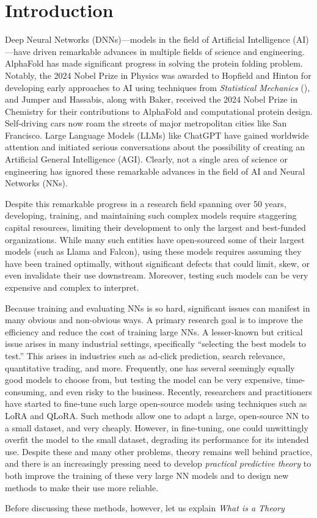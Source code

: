 
\section{Introduction}
\label{sxn:intro}
Deep Neural Networks (DNNs)—models in the field of Artificial Intelligence (AI)—have driven remarkable advances in multiple fields of science and engineering. AlphaFold has made significant progress in solving the protein folding problem.\cite{AlphaFold} Notably, the 2024 Nobel Prize in Physics was awarded to Hopfield and Hinton for developing early approaches to AI using techniques from \emph{Statistical Mechanics} (\STATMECH), and Jumper and Hassabis, along with Baker, received the 2024 Nobel Prize in Chemistry for their contributions to AlphaFold and computational protein design.\cite{Nobel2024Physics, Nobel2024Chemistry} Self-driving cars now roam the streets of major metropolitan cities like San Francisco. Large Language Models (LLMs) like ChatGPT have gained worldwide attention and initiated serious conversations about the possibility of creating an Artificial General Intelligence (AGI). Clearly, not a single area of science or engineering has ignored these remarkable advances in the field of AI and Neural Networks (NNs).

Despite this remarkable progress in a research field spanning over 50 years, developing, training, and maintaining such complex models require staggering capital resources, limiting their development to only the largest and best-funded organizations. While many such entities have open-sourced some of their largest models (such as Llama and Falcon), using these models requires assuming they have been trained optimally, without significant defects that could limit, skew, or even invalidate their use downstream. Moreover, testing such models can be very expensive and complex to interpret.

Because training and evaluating NNs is so hard, significant issues can manifest in many obvious and non-obvious ways. A primary research goal is to improve the efficiency and reduce the cost of training large NNs. A lesser-known but critical issue arises in many industrial settings, specifically “selecting the best models to test.” This arises in industries such as ad-click prediction, search relevance, quantitative trading, and more. Frequently, one has several seemingly equally good models to choose from, but testing the model can be very expensive, time-consuming, and even risky to the business. Recently, researchers and practitioners have started to fine-tune such large open-source models using techniques such as LoRA and QLoRA. Such methods allow one to adapt a large, open-source NN to a small dataset, and very cheaply. However, in fine-tuning, one could unwittingly overfit the model to the small dataset, degrading its performance for its intended use. Despite these and many other problems, theory remains well behind practice, and there is an increasingly pressing need to develop \emph{practical predictive theory} to both improve the training of these very large NN models and to design new methods to make their use more reliable.

Before discussing these methods, however, let us explain \emph{What is a \SemiEmpirical Theory}





%

